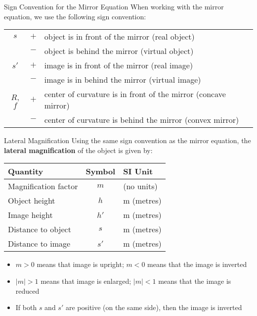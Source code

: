 \documentclass[compress,aspectratio=169]{beamer}
\newcommand{\eq}[2]{\vspace{#1}{\LARGE\begin{displaymath}#2\end{displaymath}}}
\begin{document}
\begin{frame}{Sign Convention for the Mirror Equation}
  When working with the mirror equation, we use the following sign convention:
  
  \eq{-.2in}{
    \boxed{\frac{1}{s}+\frac{1}{s'}=\frac{1}{f}}
  }
  \begin{center}
    \begin{tabular}{ccl}
      \hline
      $s$ & $+$ & object is in front of the mirror (real object) \\
      & $-$ & object is behind the mirror (virtual object)\\\hline
      $s'$ & $+$ & image is in front of the mirror (real image)\\
      & $-$ & image is in behind the mirror (virtual image)\\\hline
      $R$, $f$ & $+$ & center of curvature is in front of the mirror
      (concave mirror)\\
      & $-$ & center of curvature is behind the mirror (convex mirror)\\
      \hline
    \end{tabular}
  \end{center}
\end{frame}



\begin{frame}{Lateral Magnification}
  Using the same sign convention as the mirror equation, the
  \textbf{lateral magnification} of the object is given by:

  \eq{-.2in}{
    \boxed{m=\frac{h'}{h}=-\frac{s'}{s}}
  }
  \begin{center}
    \begin{tabular}{l|c|l}
      \rowcolor{pink}
      \textbf{Quantity} & \textbf{Symbol} & \textbf{SI Unit} \\ \hline
      Magnification factor & $m$ & (no units)\\
      Object height & $h$  & \si{\metre} (metres)\\
      Image height  & $h'$ & \si{\metre} (metres)\\
      Distance to object & $s$  & \si{\metre} (metres) \\
      Distance to image  & $s'$ & \si{\metre} (metres)
    \end{tabular}
  \end{center}
  \begin{itemize}
  \item $m>0$ means that image is upright; $m<0$ means that the image is
    inverted
  \item $|m|>1$ means that image is enlarged; $|m|<1$ means that the image is
    reduced
  \item If both $s$ and $s'$ are positive (on the same side), then the image
    is inverted
  \end{itemize}
\end{frame}
\end{document}
